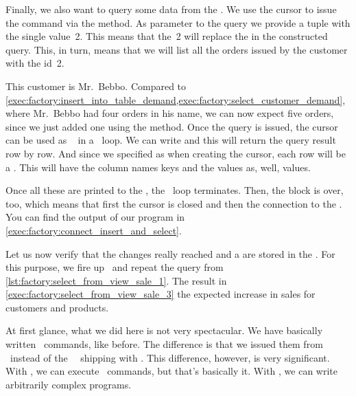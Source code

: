 Finally, we also want to query some data from the \db.
We use the cursor  to issue the command  via the  method.
As parameter to the query we provide a tuple with the single value~2.
This means that the~2 will replace the  in the constructed query.
This, in turn, means that we will list all the orders issued by the customer with the id~2.

This customer is Mr.~Bebbo.
Compared to \cref{exec:factory:insert_into_table_demand,exec:factory:select_customer_demand}, where Mr.~Bebbo had four orders in his name, we can now expect five orders, since we just added one using the  method.
Once the query is issued, the cursor can be used as ~\cite{PEP234} in a ~loop.
We can write  and this will return the query result row by row.
And since we specified  as  when creating the cursor, each row will be a .
This  will have the column names keys and the values as, well, values.

Once all these  are printed to the , the ~loop terminates.
Then, the  block is over, too, which means that first the cursor is closed and then the connection to the \db.
You can find the output of our program in \cref{exec:factory:connect_insert_and_select}.

%
%
Let us now verify that the changes really reached and a are stored in the \db.
For this purpose, we fire up \psql\ and repeat the query from \cref{lst:factory:select_from_view_sale_1}.
The result in \cref{exec:factory:select_from_view_sale_3} the expected increase in sales for customers and products.

At first glance, what we did here is not very spectacular.
We have basically written \sql\ commands, like before.
The difference is that we issued them from \python\ instead of the \psql\ \client\ shipping with \postgresql.
This difference, however, is very significant.
With \psql, we can execute \sql\ commands, but that's basically it.
With \python, we can write arbitrarily complex programs.


